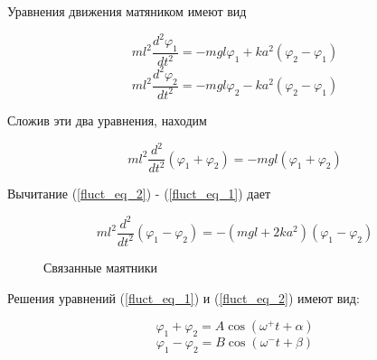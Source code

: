 \documentclass[14pt]{article}
\begin{document}
Уравнения движения матяником имеют вид

\begin{equation}\label{fluct_eq_1}
ml^2\frac{d^2\varphi_1}{dt^2} = -mgl\varphi_1 + ka^2(\varphi_2 - \varphi_1)
\end{equation}	
\begin{equation}\label{fluct_eq_2}
ml^2\frac{d^2\varphi_2}{dt^2} = -mgl\varphi_2 - ka^2(\varphi_2 - \varphi_1)
\end{equation}

\noindent Сложив эти два уравнения, находим

\begin{equation}\label{fluct_sum}
ml^2\frac{d^2}{dt^2}(\varphi_1 + \varphi_2) = -mgl(\varphi_1 + \varphi_2)
\end{equation}

Вычитание (\ref{fluct_eq_2}) - (\ref{fluct_eq_1}) дает

\begin{equation}\label{fluct_div}
ml^2\frac{d^2}{dt^2}(\varphi_1 - \varphi_2) = -(mgl + 2ka^2)(\varphi_1 - \varphi_2)
\end{equation}


\begin{figure}[h!]
	\caption{Связанные маятники}
	\label{fig:image}
\end{figure} 


Решения уравнений (\ref{fluct_eq_1}) и (\ref{fluct_eq_2}) имеют вид:

\begin{equation}\label{fluct_eq_solve_1}
\varphi_1 + \varphi_2 = A\cos(\omega^+t + \alpha)
\end{equation}
\begin{equation}\label{fluct_eq_solve_2}
\varphi_1 - \varphi_2 = B\cos(\omega^-t + \beta)
\end{equation}
\end{document}
